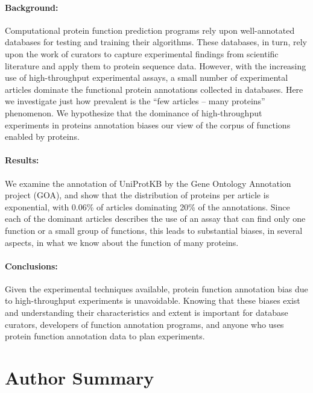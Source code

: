 \documentclass[12pt]{article}
\begin{document}
        \paragraph*{Background:} Computational protein function
prediction programs rely upon well-annotated databases for testing and training
their algorithms. These databases, in turn, rely upon the work of curators
to capture experimental findings from scientific literature and apply them to protein
sequence data. However, with the increasing use of high-throughput experimental
assays,  a small number of experimental articles dominate
the functional protein annotations collected in databases. 
Here we investigate just how prevalent is the ``few articles --
many proteins'' phenomenon. We hypothesize that the dominance of high-throughput experiments in
proteins annotation biases our view of the corpus of functions enabled by proteins.
      
        \paragraph*{Results:} We examine the annotation of
UniProtKB by the Gene Ontology Annotation project (GOA), and show that
the distribution of proteins per article is exponential, with 0.06\% of articles
dominating 20\% of the annotations. Since each of the dominant articles
describes the use of an assay that can find only one function or a small
group of functions, this leads to substantial biases, in several aspects, in what we know
about the function of many proteins.

        \paragraph*{Conclusions:} Given the experimental techniques available, protein
function annotation bias due to high-throughput experiments is unavoidable. Knowing that
these biases exist and understanding their characteristics and extent is important for
database curators, developers of function annotation programs, and anyone who uses protein
function annotation data to plan experiments.

\section*{Author Summary}
\end{document}
